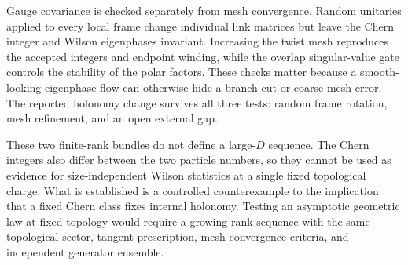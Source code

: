 Gauge covariance is checked separately from mesh convergence.  Random
unitaries applied to every local frame change individual link matrices but
leave the Chern integer and Wilson eigenphases invariant.  Increasing the
twist mesh reproduces the accepted integers and endpoint winding, while the
overlap singular-value gate controls the stability of the polar factors.
These checks matter because a smooth-looking eigenphase flow can otherwise
hide a branch-cut or coarse-mesh error.  The reported holonomy change survives
all three tests: random frame rotation, mesh refinement, and an open external
gap.

These two finite-rank bundles do not define a large-$D$ sequence.  The Chern
integers also differ between the two particle numbers, so they cannot be used
as evidence for size-independent Wilson statistics at a single fixed
topological charge.  What is established is a controlled counterexample to
the implication that a fixed Chern class fixes internal holonomy.  Testing an
asymptotic geometric law at fixed topology would require a growing-rank
sequence with the same topological sector, tangent prescription, mesh
convergence criteria, and independent generator ensemble.
